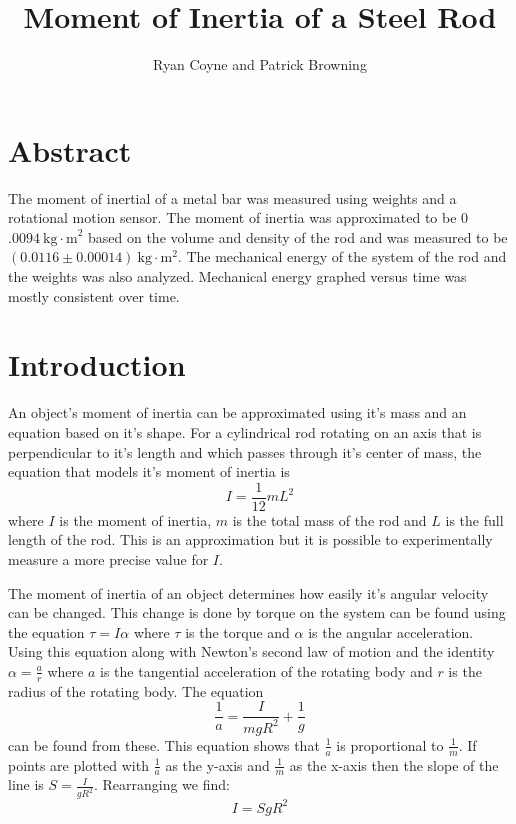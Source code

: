 \documentclass[12pt]{article}
\begin{document}
    \title{Moment of Inertia of a Steel Rod}
    \author{Ryan Coyne and Patrick Browning}
    \maketitle
    \section{Abstract}
        The moment of inertial of a metal bar was measured using weights and a rotational motion sensor. The moment of inertia was approximated to be 0\(.0094~\mathrm{kg\cdot m}^2\) based on the volume and density of the rod and was measured to be \((0.0116 \pm 0.00014)~\mathrm{kg\cdot m^2}\). The mechanical energy of the system of the rod and the weights was also analyzed. Mechanical energy graphed versus time was mostly consistent over time.
    \section{Introduction}
        An object's moment of inertia can be approximated using it's mass and an equation based on it's shape. For a cylindrical rod rotating on an axis that is perpendicular to it's length and which passes through it's center of mass, the equation that models it's moment of inertia is
        \begin{equation*}
            I = \frac{1}{12}mL^2
        \end{equation*}
        where \(I\) is the moment of inertia, \(m\) is the total mass of the rod and \(L\) is the full length of the rod. This is an approximation but it is possible to experimentally measure a more precise value for \(I\).
        
        The moment of inertia of an object determines how easily it's angular velocity can be changed. This change is done by torque on the system can be found using the equation \(\tau = I \alpha\) where \(\tau\) is the torque and \(\alpha\) is the angular acceleration. Using this equation along with Newton's second law of motion and the identity \(\alpha = \frac{a}{r}\) where \(a\) is the tangential acceleration of the rotating body and \(r\) is the radius of the rotating body. The equation
        \begin{equation*}
            \frac{1}{a} = \frac{I}{mgR^2}+\frac{1}{g}
        \end{equation*} 
        can be found from these. This equation shows that \(\frac{1}{a}\) is proportional to \(\frac{1}{m}\). If points are plotted with \(\frac{1}{a}\) as the y-axis and \(\frac{1}{m}\) as the x-axis then the slope of the line is \(S = \frac{I}{gR^2}\). Rearranging we find:
        \begin{equation*}
            I = SgR^2
        \end{equation*}
\end{document}
